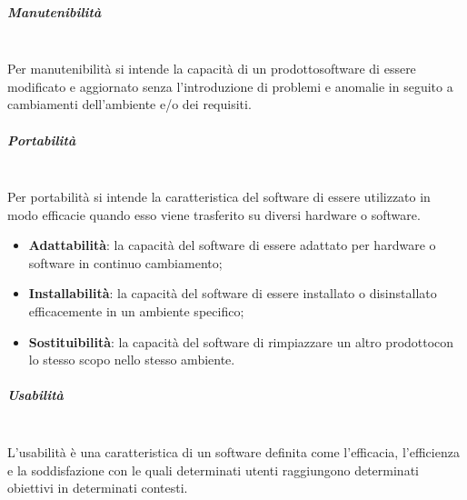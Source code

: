 		\subparagraph{Manutenibilità} \mbox{}\\[1mm]
		Per manutenibilità si intende la capacità di un prodotto\glosp software di essere modificato e aggiornato senza l'introduzione di problemi e anomalie in seguito a cambiamenti dell'ambiente e/o dei requisiti.
	\subparagraph{Portabilità} \mbox{}\\ 
	Per portabilità si intende la caratteristica del software di essere utilizzato in modo efficacie quando esso viene trasferito su diversi hardware o software.
	\begin{itemize}
		\item \textbf{Adattabilità}: la capacità del software di essere adattato per hardware o software in continuo cambiamento;
		\item \textbf{Installabilità}: la capacità del software di essere installato o disinstallato efficacemente in un ambiente specifico;
		\item \textbf{Sostituibilità}: la capacità del software di rimpiazzare un altro prodotto\glosp con lo stesso scopo nello stesso ambiente.
	\end{itemize}

	\subparagraph{Usabilità} \mbox{}\\[1mm]
	L'usabilità è una caratteristica di un software definita come l'efficacia, l'efficienza e la soddisfazione con le quali determinati utenti raggiungono determinati obiettivi in determinati contesti.
